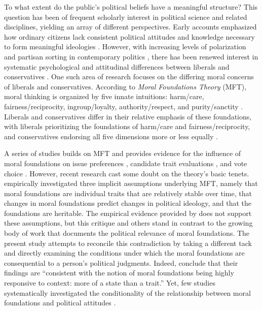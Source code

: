 \documentclass[12pt]{article}
\begin{document}
To what extent do the public's political beliefs have a meaningful structure? This question has been of frequent scholarly interest in political science and related disciplines, yielding an array of different perspectives. Early accounts emphasized how ordinary citizens lack consistent political attitudes and knowledge necessary to form meaningful ideologies \citep[e.g.][]{converse1964nature}. However, with increasing levels of polarization and partisan sorting in contemporary politics \citep{iyengar2015fear}, there has been renewed interest in systematic psychological and attitudinal differences between liberals and conservatives \citep{jost2006end}. One such area of research focuses on the differing moral concerns of liberals and conservatives. According to \textit{Moral Foundations Theory} (MFT), moral thinking is organized by five innate intuitions: harm/care, fairness/reciprocity, ingroup/loyalty, authority/respect, and purity/sanctity \citep{haidt2008moral,graham2011mapping}. Liberals and conservatives differ in their relative emphasis of these foundations, with liberals prioritizing the foundations of harm/care and fairness/reciprocity, and conservatives endorsing all five dimensions more or less equally \citep{graham2009liberals}.

A series of studies builds on MFT and provides evidence for the influence of moral foundations on issue preferences \citep{koleva2012tracing, kertzer2014moral, low2015moral, clifford2015concerns}, candidate trait evaluations \citep{clifford2014linking}, and vote choice \citep{iyer2010beyond, franks2015using}. However, recent research cast some doubt on the theory's basic tenets. \citet{smith2016intuitive} empirically investigated three implicit assumptions underlying MFT, namely that moral foundations are individual traits that are relatively stable over time, that changes in moral foundations predict changes in political ideology, and that the foundations are heritable. The empirical evidence provided by \citet{smith2016intuitive} does not support these assumptions, but this critique and others \citep[e.g.,][]{suhler2011can} stand in contrast to the growing body of work that documents the political relevance of moral foundations. The present study attempts to reconcile this contradiction by taking a different tack and directly examining the conditions under which the moral foundations are consequential to a person's political judgments. Indeed, \citet{smith2016intuitive} conclude that their findings are ``consistent with the notion of moral foundations being highly responsive to context: more of a state than a trait.'' Yet, few studies systematically investigated the conditionality of the relationship between moral foundations and political attitudes \citep[see][for a notable exception]{clifford2015concerns}.
\end{document}
